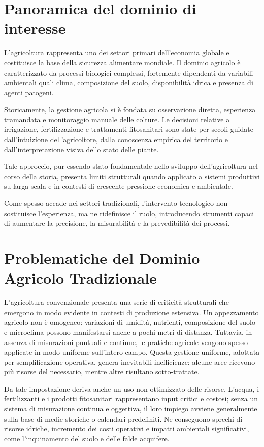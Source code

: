 \section{Panoramica del dominio di interesse}
L’agricoltura rappresenta uno dei settori primari dell’economia globale e costituisce la base della sicurezza alimentare mondiale. Il dominio agricolo è caratterizzato da processi biologici complessi, fortemente dipendenti da variabili ambientali quali clima, composizione del suolo, disponibilità idrica e presenza di agenti patogeni.

Storicamente, la gestione agricola si è fondata su osservazione diretta, esperienza tramandata e monitoraggio manuale delle colture. Le decisioni relative a irrigazione, fertilizzazione e trattamenti fitosanitari sono state per secoli guidate dall’intuizione dell’agricoltore, dalla conoscenza empirica del territorio e dall’interpretazione visiva dello stato delle piante.

Tale approccio, pur essendo stato fondamentale nello sviluppo dell’agricoltura nel corso della storia, presenta limiti strutturali quando applicato a sistemi produttivi su larga scala e in contesti di crescente pressione economica e ambientale.

Come spesso accade nei settori tradizionali, l’intervento tecnologico non sostituisce l’esperienza, ma ne ridefinisce il ruolo, introducendo strumenti capaci di aumentare la precisione, la misurabilità e la prevedibilità dei processi.

\section{Problematiche del Dominio Agricolo Tradizionale}
L’agricoltura convenzionale presenta una serie di criticità strutturali che emergono in modo evidente in contesti di produzione estensiva. Un appezzamento agricolo non è omogeneo: variazioni di umidità, nutrienti, composizione del suolo e microclima possono manifestarsi anche a pochi metri di distanza. Tuttavia, in assenza di misurazioni puntuali e continue, le pratiche agricole vengono spesso applicate in modo uniforme sull’intero campo. Questa gestione uniforme, adottata per semplificazione operativa, genera inevitabili inefficienze: alcune aree ricevono più risorse del necessario, mentre altre risultano sotto-trattate.\newline

Da tale impostazione deriva anche un uso non ottimizzato delle risorse. L’acqua, i fertilizzanti e i prodotti fitosanitari rappresentano input critici e costosi; senza un sistema di misurazione continua e oggettiva, il loro impiego avviene generalmente sulla base di medie storiche o calendari predefiniti. Ne conseguono sprechi di risorse idriche, incremento dei costi operativi e impatti ambientali significativi, come l’inquinamento del suolo e delle falde acquifere.\newline


